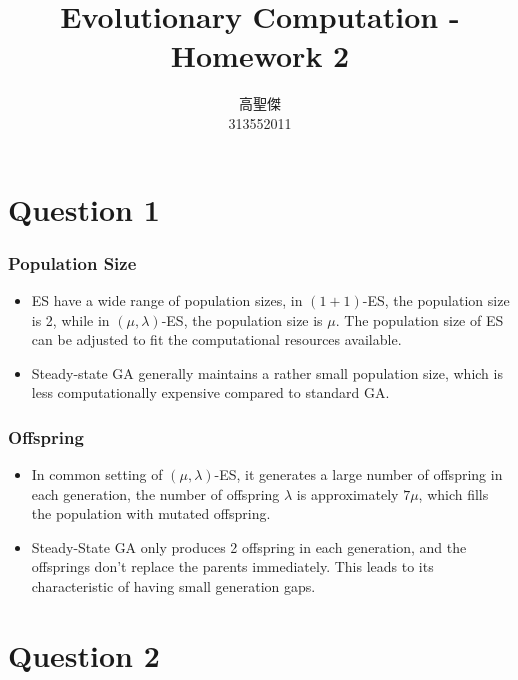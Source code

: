 \documentclass[12pt,letterpaper]{article}
\begin{document}
\begin{CJK}{UTF8}{bkai}
    \title{Evolutionary Computation - Homework 2}

    \author{
        高聖傑\\
        313552011\\
    }

    \maketitle
\end{CJK}

\section*{Question 1}

\subsubsection*{Population Size}
\begin{itemize}
    \item ES have a wide range of population sizes, in $(1+1)$-ES, the population size is 2, while in $(\mu, \lambda)$-ES, the population size is $\mu$. The population size of ES can be adjusted to fit the computational resources available.
    \item Steady-state GA generally maintains a rather small population size, which is less computationally expensive compared to standard GA.
\end{itemize}

\subsubsection*{Offspring}
\begin{itemize}
    \item In common setting of $(\mu, \lambda)$-ES, it generates a large number of offspring in each generation, the number of offspring $\lambda$ is approximately $7\mu$, which fills the population with mutated offspring.
    \item Steady-State GA only produces 2 offspring in each generation, and the offsprings don't replace the parents immediately. This leads to its characteristic of having small generation gaps.
\end{itemize}

\section*{Question 2}
\end{document}
